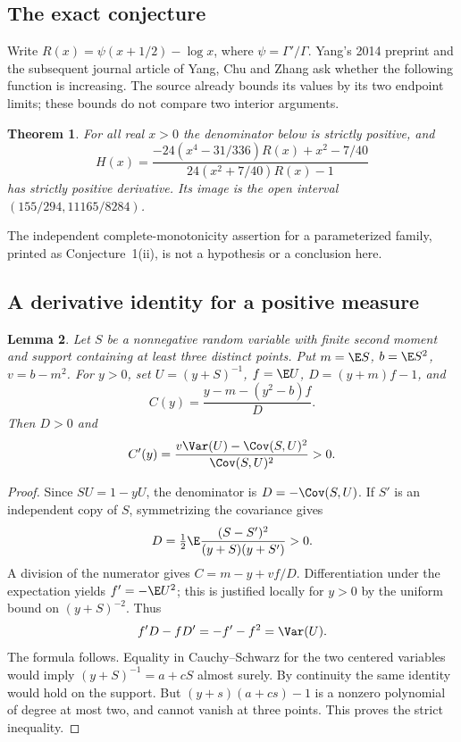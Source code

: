 \documentclass[11pt,a4paper]{article}
\numberwithin{equation}{section}
\newtheorem{theorem}{Theorem}[section]
\newtheorem{lemma}[theorem]{Lemma}
\theoremstyle{definition}
\theoremstyle{remark}
\begin{document}
\subsection{The exact conjecture}
Write $R(x)=\psi(x+1/2)-\log x$, where $\psi=\Gamma'/\Gamma$.
Yang's 2014 preprint \cite{r27taisho:yang} and the subsequent journal article of
Yang, Chu and Zhang \cite{r27taisho:ycz} ask whether the following function is
increasing. The source already bounds its values by its two endpoint limits;
these bounds do not compare two interior arguments.

\begin{theorem}\label{r27taisho:main}
For all real $x>0$ the denominator below is strictly positive, and
\[
 H(x)=\frac{-24(x^4-31/336)R(x)+x^2-7/40}
                 {24(x^2+7/40)R(x)-1}
\]
has strictly positive derivative. Its image is the open interval
$(155/294,11165/8284)$.
\end{theorem}
The independent complete-monotonicity assertion for a parameterized family,
printed as Conjecture~1(ii), is not a hypothesis or a conclusion here.

\subsection{A derivative identity for a positive measure}
\begin{lemma}\label{r27taisho:general}
Let $S$ be a nonnegative random variable with finite second moment and
support containing at least three distinct points. Put
$m=\E S$, $b=\E S^2$, $v=b-m^2$. For $y>0$, set $U=(y+S)^{-1}$,
$f=\E U$, $D=(y+m)f-1$, and
\[
 C(y)=\frac{y-m-(y^2-b)f}{D}.
\]
Then $D>0$ and
\[
 C'(y)=\frac{v\Var(U)-\Cov(S,U)^2}{\Cov(S,U)^2}>0.
\]
\end{lemma}
\begin{proof}
Since $SU=1-yU$, the denominator is $D=-\Cov(S,U)$.
If $S'$ is an independent copy of $S$, symmetrizing the covariance gives
\[
 D=\tfrac12\E\frac{(S-S')^2}{(y+S)(y+S')}>0 .
\]
A division of the numerator gives $C=m-y+vf/D$. Differentiation under the
expectation yields $f'=-\E U^2$; this is justified locally for $y>0$ by
the uniform bound on $(y+S)^{-2}$. Thus
\[
 f'D-fD'=-f'-f^2=\Var(U).
\]
The formula follows. Equality in Cauchy--Schwarz for the two centered
variables would imply $(y+S)^{-1}=a+cS$ almost surely. By continuity the
same identity would hold on the support. But
$(y+s)(a+cs)-1$ is a nonzero polynomial of degree at most two, and cannot
vanish at three points. This proves the strict inequality.
\end{proof}
\end{document}
